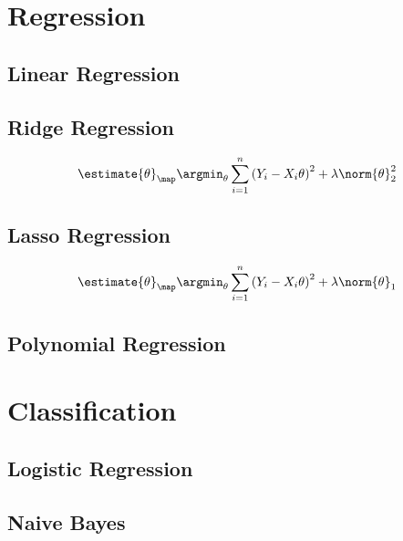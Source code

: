 \documentclass[18pt,a3paper,landscape, ncols=3]{cheatsheet}
\begin{document}
\clearpage		
		
\section{Regression} \seperator
	\subsection{Linear Regression}
		\begin{mdframed}
		\end{mdframed}
	\subsection{Ridge Regression}
		\begin{mdframed}
			\[
				\estimate{\theta}_{\map}\argmin_{\theta} \sum_{i=1}^{n} {(Y_i - X_i \theta)}^2 + \lambda \norm{\theta}_{2}^{2}
			\]
		\end{mdframed}
	\subsection{Lasso Regression}
		\begin{mdframed}
			\[
				\estimate{\theta}_{\map}\argmin_{\theta} \sum_{i=1}^{n} {(Y_i - X_i \theta)}^2 + \lambda \norm{\theta}_{1}
			\]
		\end{mdframed}
	\subsection{Polynomial Regression}
		\begin{mdframed}
		\end{mdframed}

\section{Classification} \seperator
	\subsection{Logistic Regression}
		\begin{mdframed}
		\end{mdframed}
	\subsection{Naive Bayes}
		\begin{mdframed}
		\end{mdframed}
\end{document}
